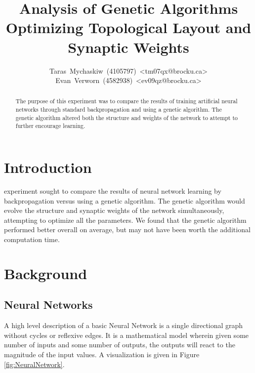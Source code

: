 \documentclass[journal]{IEEEtran}
\begin{document}
\title{Analysis of Genetic Algorithms Optimizing Topological Layout and Synaptic Weights }

\author{Taras~Mychaskiw~(4105797)~\textless{}tm07qx@brocku.ca\textgreater\\%
Evan~Verworn~(4582938)~\textless{}ev09qz@brocku.ca\textgreater%
}


\maketitle

\begin{abstract}
  The purpose of this experiment was to compare the results of training artificial neural networks
  through standard backpropagation and using a genetic algorithm. The genetic algorithm altered both
  the structure and weights of the network to attempt to further encourage learning.
\end{abstract}

\IEEEpeerreviewmaketitle

\section{Introduction}
 experiment sought to compare the results of neural network learning by backpropagation
versus using a genetic algorithm. The genetic algorithm would evolve the structure and synaptic weights
of the network simultaneously, attempting to optimize all the parameters. We found that the genetic algorithm
performed better overall on average, but may not have been worth the additional computation time.

\section{Background}
  \subsection{Neural Networks}
  A high level description of a basic Neural Network is a single directional graph without
  cycles or reflexive edges. It is a mathematical model wherein given some number of inputs
  and some number of outputs, the outputs will react to the magnitude of the input values. A
  visualization is given in Figure \ref{fig:NeuralNetwork}.
\end{document}

